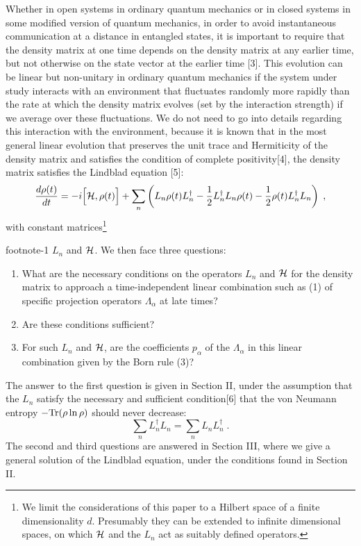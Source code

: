\documentclass[12pt]{article}
\def\fnote#1#2{\begingroup\def\thefootnote{#1}\footnote{#2}\addtocounter
{footnote}{-1}\endgroup}
\begin{document}
Whether in  open systems in ordinary quantum mechanics or in closed systems in some modified version of quantum mechanics,  in order to avoid instantaneous communication at a distance in entangled states, it is important to require that the density matrix at one time depends  on the density matrix at any earlier time, but not otherwise on  the state vector at the earlier time [3].  This evolution can be linear but non-unitary in ordinary quantum mechanics if the system under study interacts with an environment that fluctuates randomly more rapidly than the rate at which the density matrix evolves (set by the interaction strength) if we average over these fluctuations.   We do not need to go into details regarding this interaction with the environment, because it is known that in the most general linear evolution that preserves the unit trace and Hermiticity of the density matrix and satisfies the condition of complete positivity[4], the density matrix satisfies the Lindblad equation [5]:
\begin{equation}
\frac{d\rho(t)}{dt}=-i\Big[{\cal H},\rho(t)\Big]+\sum_n \left(L_n\rho(t)L_n^\dagger-\frac{1}{2}L_n^\dagger L_n \rho(t)
-\frac{1}{2}\rho(t) L_n^\dagger L_n\right)\;,
\end{equation}
with constant matrices\fnote{**}{We limit the considerations of this paper to a Hilbert space of a finite dimensionality $d$.  Presumably they can be extended to infinite dimensional spaces, on which ${\cal H}$ and the $L_n$ act as suitably defined operators.} $L_n$ and ${\cal H}$.  
We then face three questions:
\begin{enumerate}
  \item What are the necessary conditions on the operators  $L_n$  and ${\cal H}$ for  the density matrix to approach a time-independent linear combination such as (1) of specific projection operators $\Lambda_\alpha$ at late times?
  \item  Are these conditions sufficient?  
  \item For such $L_n$  and ${\cal H}$, are the coefficients $p_\alpha$ of the $\Lambda_\alpha$ in this linear combination given by the Born rule (3)? 
 \end{enumerate}  
The answer to the first question is given in Section II, under the assumption that the $L_n$ satisfy the necessary and sufficient condition[6] that the von Neumann entropy $-{\rm Tr}(\rho\ln\rho)$ should never decrease:
\begin{equation}
\sum_n L_n^\dagger L_n=\sum_n L_n L^\dagger_n\;.
\end{equation}
The second and third questions are answered in Section III, where we give a general solution of the Lindblad equation, under the conditions found in Section II.
\end{document}
